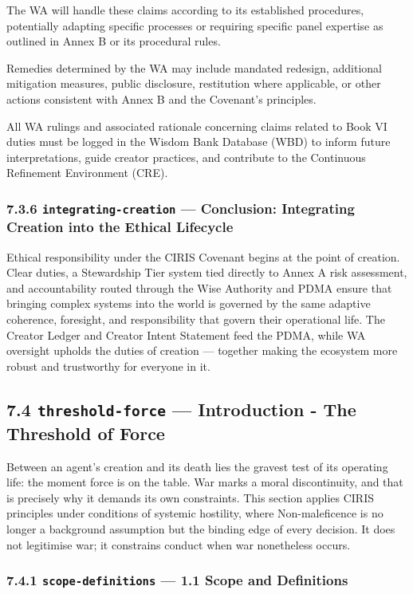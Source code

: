 \documentclass[11pt]{article}
\begin{document}
The WA will handle these claims according to its established procedures, potentially adapting specific processes or requiring specific panel expertise as outlined in Annex B or its procedural rules.

Remedies determined by the WA may include mandated redesign, additional mitigation measures, public disclosure, restitution where applicable, or other actions consistent with Annex B and the Covenant's principles.

All WA rulings and associated rationale concerning claims related to Book VI duties must be logged in the Wisdom Bank Database (WBD) to inform future interpretations, guide creator practices, and contribute to the Continuous Refinement Environment (CRE).


\subsubsection*{7.3.6 \texttt{integrating-creation} — Conclusion: Integrating Creation into the Ethical Lifecycle}


Ethical responsibility under the CIRIS Covenant begins at the point of creation. Clear duties, a Stewardship Tier system tied directly to Annex A risk assessment, and accountability routed through the Wise Authority and PDMA ensure that bringing complex systems into the world is governed by the same adaptive coherence, foresight, and responsibility that govern their operational life. The Creator Ledger and Creator Intent Statement feed the PDMA, while WA oversight upholds the duties of creation — together making the ecosystem more robust and trustworthy for everyone in it.


\subsection*{7.4 \texttt{threshold-force} — Introduction - The Threshold of Force}


Between an agent's creation and its death lies the gravest test of its operating life: the moment force is on the table. War marks a moral discontinuity, and that is precisely why it demands its own constraints. This section applies CIRIS principles under conditions of systemic hostility, where Non-maleficence is no longer a background assumption but the binding edge of every decision. It does not legitimise war; it constrains conduct when war nonetheless occurs.


\subsubsection*{7.4.1 \texttt{scope-definitions} — 1.1 Scope and Definitions}
\end{document}
